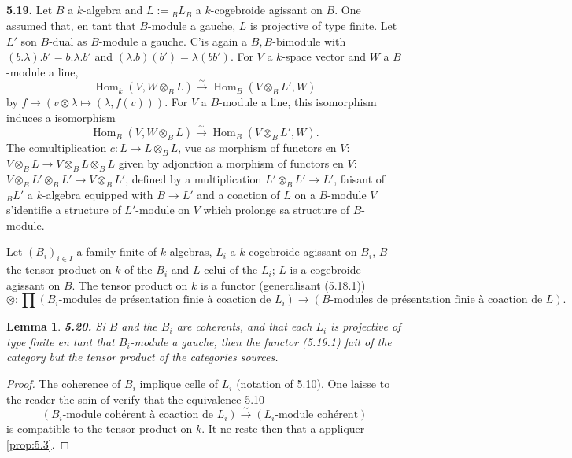 \documentclass[12pt,a4paper]{article}
\theoremstyle{plain}
\newtheorem{lemma}[theorem]{Lemma}
\theoremstyle{definition}
\theoremstyle{remark}
\DeclareMathOperator{\Hom}{Hom}
\begin{document}
\subsection{}

\textbf{5.19.} Let $B$ a $k$-algebra and $L := {}_B L_B$ a $k$-cogebroide agissant on $B$. One assumed that, en tant that $B$-module a gauche, $L$ is projective of type finite. Let $L'$ son $B$-dual as $B$-module a gauche. C'is again a $B,B$-bimodule with $(b.\lambda).b' = b.\lambda.b'$ and $(\lambda.b)(b') = \lambda(bb')$. For $V$ a $k$-space vector and $W$ a $B$-module a line,
\[
\Hom_k(V, W \otimes_B L) \xrightarrow{\sim} \Hom_B(V \otimes_B L', W)
\]
by $f \mapsto (v \otimes \lambda \mapsto (\lambda, f(v)))$. For $V$ a $B$-module a line, this isomorphism induces a isomorphism
\[
\Hom_B(V, W \otimes_B L) \xrightarrow{\sim} \Hom_B(V \otimes_B L', W).
\]
The comultiplication $c : L \to L \otimes_B L$, vue as morphism of functors en $V$: $V \otimes_B L \to V \otimes_B L \otimes_B L$ given by adjonction a morphism of functors en $V$: $V \otimes_B L' \otimes_B L' \to V \otimes_B L'$, defined by a multiplication $L' \otimes_B L' \to L'$, faisant of $_B L'$ a $k$-algebra equipped with $B \to L'$ and a coaction of $L$ on a $B$-module $V$ s'identifie a structure of $L'$-module on $V$ which prolonge sa structure of $B$-module.

Let $(B_i)_{i \in I}$ a family finite of $k$-algebras, $L_i$ a $k$-cogebroide agissant on $B_i$, $B$ the tensor product on $k$ of the $B_i$ and $L$ celui of the $L_i$; $L$ is a cogebroide agissant on $B$. The tensor product on $k$ is a functor (generalisant (5.18.1))
\begin{equation}\label{eq:5.19.1}
\otimes : \prod (B_i\text{-modules de présentation finie à coaction de } L_i) \longrightarrow (B\text{-modules de présentation finie à coaction de } L).
\end{equation}

\begin{lemma}\label{lem:5.20}
\textbf{5.20.} Si $B$ and the $B_i$ are coherents, and that each $L_i$ is projective of type finite en tant that $B_i$-module a gauche, then the functor (5.19.1) fait of the category but the tensor product of the categories sources.
\end{lemma}

\begin{proof}
The coherence of $B_i$ implique celle of $L_i$ (notation of 5.10). One laisse to the reader the soin of verify that the equivalence 5.10
\[
(B_i\text{-module cohérent à coaction de } L_i) \xrightarrow{\sim} (L_i\text{-module cohérent})
\]
is compatible to the tensor product on $k$. It ne reste then that a appliquer \ref{prop:5.3}.
\end{proof}
\end{document}
